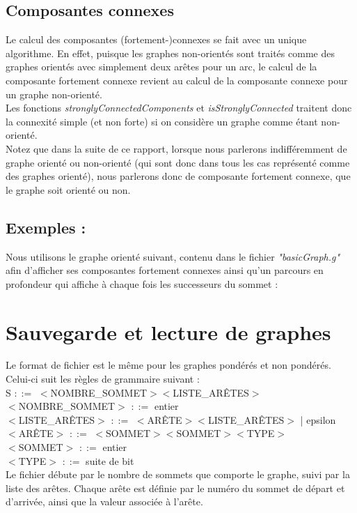 \documentclass[12pt]{article}
\begin{document}
\subsection{Composantes connexes}
Le calcul des composantes (fortement-)connexes se fait avec un unique algorithme. En effet, puisque les graphes non-orientés sont traités comme des graphes orientés avec simplement deux arêtes pour un arc, le calcul de la composante fortement connexe revient au calcul de la composante connexe pour un graphe non-orienté. \\
Les fonctions {\it stronglyConnectedComponents} et {\it isStronglyConnected} traitent donc la connexité simple (et non forte) si on considère un graphe comme étant non-orienté. \\
Notez que dans la suite de ce rapport, lorsque nous parlerons indifféremment de graphe orienté ou non-orienté (qui sont donc dans tous les cas représenté comme des graphes orienté), nous parlerons donc de composante fortement connexe, que le graphe soit orienté ou non.\\
\clearpage
\subsection{Exemples :}
Nous utilisons le graphe orienté suivant, contenu dans le fichier {\it "basicGraph.g"} afin d'afficher ses composantes fortement connexes ainsi qu'un parcours en profondeur qui affiche à chaque fois les successeurs du sommet : \\

\section{Sauvegarde et lecture de graphes}
Le format de fichier est le même pour les graphes pondérés et non pondérés. Celui-ci suit les règles de grammaire suivant : \\

S $::=$ $<$NOMBRE\_SOMMET$><$LISTE\_ARÊTES$>$ \\
$<$NOMBRE\_SOMMET$>$ $::=$ entier \\
$<$LISTE\_ARÊTES$>$ $::=$ $<$ARÊTE$><$LISTE\_ARÊTES$>$ | epsilon \\
$<$ARÊTE$>$ $::=$ $<$SOMMET$><$SOMMET$><$TYPE$>$  \\
$<$SOMMET$>$ $::=$ entier \\
$<$TYPE$>$ $::=$ suite de bit \\

Le fichier débute par le nombre de sommets que comporte le graphe, suivi par la liste des arêtes. Chaque arête est définie par le numéro du sommet de départ et d'arrivée, ainsi que la valeur associée à l'arête.\\ 
\end{document}
